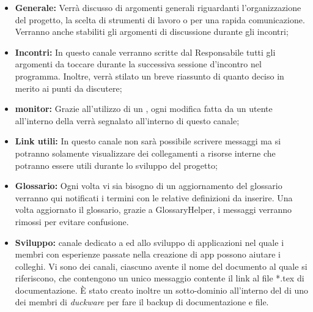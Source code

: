 \begin{itemize}
    \item \textbf{Generale: }Verrà discusso di argomenti generali riguardanti l’organizzazione del progetto, la scelta di strumenti di lavoro o per una rapida comunicazione. Verranno anche stabiliti gli argomenti di discussione durante gli incontri;
    \item \textbf{Incontri: }In questo canale verranno scritte dal Responsabile tutti gli argomenti da toccare durante la successiva sessione d’incontro nel programma. Inoltre, verrà stilato un breve riassunto di quanto deciso in merito ai punti da discutere;
    \item \textbf{ monitor: }Grazie all’utilizzo di un , ogni modifica fatta da un utente all’interno della  verrà segnalato all’interno di questo canale;
    \item \textbf{Link utili: }In questo canale non sarà possibile scrivere messaggi ma si potranno solamente visualizzare dei collegamenti a risorse interne che potranno essere utili durante lo sviluppo del progetto;
    \item \textbf{Glossario: }Ogni volta vi sia bisogno di un aggiornamento del glossario verranno qui notificati i termini con le relative definizioni da inserire. Una volta aggiornato il glossario, grazie a GlossaryHelper, i messaggi verranno rimossi per evitare confusione.
    \item \textbf{Sviluppo: } canale dedicato a  ed allo sviluppo di applicazioni  nel quale i membri con esperienze passate nella creazione di app possono aiutare i colleghi.
Vi sono dei canali, ciascuno avente il nome del documento al quale si riferiscono, che contengono un unico messaggio contente il link al file *.tex di documentazione. È stato creato inoltre un sotto-dominio all’interno del  di uno dei membri di \emph{duckware} per fare il backup di documentazione e file.
\end{itemize}
